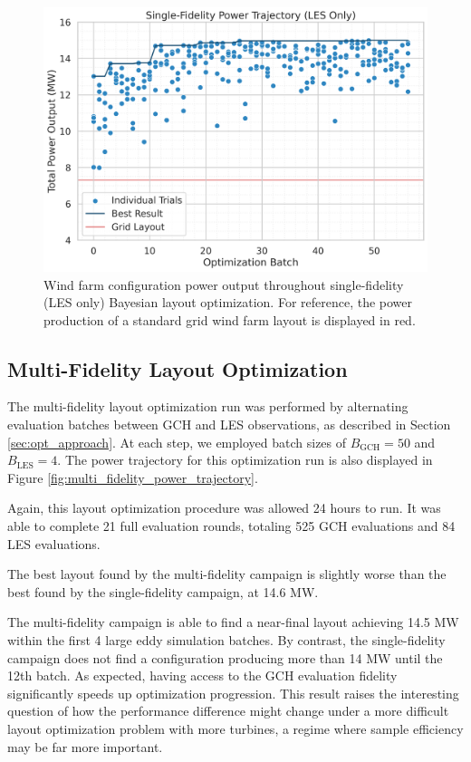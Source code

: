 \documentclass[11pt]{article}
\begin{document}
\begin{figure}[htbp]
    \centering
    \includegraphics[scale=0.5]{../campaigns/les_only/power_trajectory.png}
    \caption{Wind farm configuration power output throughout single-fidelity
    (LES only) Bayesian layout optimization. For reference, the power
    production of a standard grid wind farm layout is displayed in red.
    }
    \label{fig:les_only_power_trajectory}
\end{figure}

\subsection{Multi-Fidelity Layout Optimization}
The multi-fidelity layout optimization run was performed by alternating
evaluation batches between GCH and LES observations, as described in Section
\ref{sec:opt_approach}. At each step, we employed batch sizes of $B_\text{GCH}
= 50$ and $B_\text{LES} = 4$. The power trajectory for this optimization run is
also displayed in Figure \ref{fig:multi_fidelity_power_trajectory}.

Again, this layout optimization procedure was allowed 24 hours to run. It was
able to complete 21 full evaluation rounds, totaling 525 GCH evaluations and 84
LES evaluations. 

The best layout found by the multi-fidelity campaign is slightly worse than
the best found by the single-fidelity campaign, at 14.6 MW.

The multi-fidelity campaign is able to find a near-final layout
achieving 14.5 MW within the first 4 large eddy simulation batches. By contrast,
the single-fidelity campaign does not find a configuration producing more than 14 MW
until the 12th batch. As expected, having access to the GCH evaluation fidelity
significantly speeds up optimization progression. This result raises the interesting question
of how the performance difference might change under a more difficult layout optimization
problem with more turbines, a regime where sample efficiency may be far more important.
\end{document}
